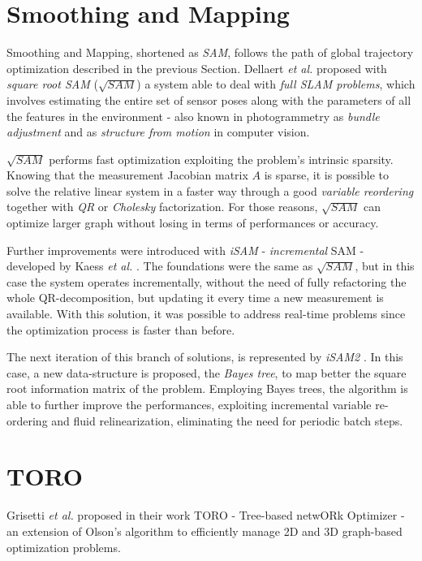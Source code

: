 \section{Smoothing and Mapping}\label{sec:sam}
Smoothing and Mapping, shortened as \textit{SAM}, follows the path of global trajectory optimization described in the previous Section. Dellaert \textit{et al.} proposed with \textit{square root SAM} ($\sqrt{SAM}$) \cite{dellaert2006square} a system able to deal with \textit{full SLAM problems}, which involves estimating the entire set of sensor poses along with the parameters of all the features in the environment - also known in photogrammetry as \textit{bundle adjustment} and as \textit{structure from motion} in computer vision.

$\sqrt{SAM}$ performs fast optimization exploiting the problem's intrinsic sparsity. Knowing that the measurement Jacobian matrix $A$ is sparse, it is possible to solve the relative linear system in a faster way through a good \textit{variable reordering} together with \textit{QR} or \textit{Cholesky} factorization. For those reasons, $\sqrt{SAM}$ can optimize larger graph without losing in terms of performances or accuracy.

Further improvements were introduced with \textit{iSAM} - \textit{incremental} SAM - developed by Kaess \textit{et al.} \cite{kaess2007isam}. The foundations were the same as $\sqrt{SAM}$, but in this case the system operates incrementally, without the need of fully refactoring the whole QR-decomposition, but updating it every time a new measurement is available. With this solution, it was possible to address real-time problems since the optimization process is faster than before. 

The next iteration of this branch of solutions, is represented by \textit{iSAM2} \cite{kaess2012isam2}. In this case, a new data-structure is proposed, the \textit{Bayes tree}, to map better the square root information matrix of the problem. Employing Bayes trees, the algorithm is able to further improve the performances, exploiting incremental variable re-ordering and fluid relinearization, eliminating the need for periodic batch steps. 

\section{TORO}\label{sec:toro}
Grisetti \textit{et al.} proposed in their work TORO \cite{toro} - Tree-based netwORk Optimizer - an extension of Olson's algorithm to efficiently manage 2D and 3D graph-based optimization problems. 

